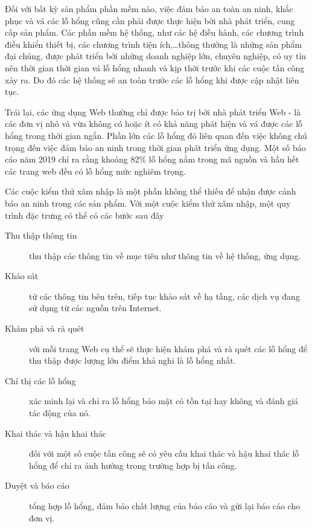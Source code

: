 \documentclass[./../main.tex]{subfiles}
\begin{document}
Đối với bất kỳ sản phẩm phần mềm nào, việc đảm bảo an toàn an ninh, khắc phục và vá các lỗ hổng cũng cần phải được thực hiện bởi nhà phát triển, cung cấp sản phẩm. Các phần mềm hệ thống, như các hệ điều hành, các chương trình điều khiển thiết bị, các chương trình tiện ích,\ldots thông thường là những sản phẩm đại chúng, được phát triển bởi những doanh nghiệp lớn, chuyên nghiệp, có uy tín nên thời gian thời gian vá lỗ hổng nhanh và kịp thời trước khi các cuộc tấn công xảy ra. Do đó các hệ thống sẽ an toàn trước các lỗ hổng khi được cập nhật liên tục.


Trái lại, các ứng dụng Web thường chỉ được bảo trị bởi nhà phát triển Web -
là các đơn vị nhỏ và vừa không có hoặc ít có khả năng phát hiện và vá được các lỗ hổng trong thời gian ngắn. Phần lớn các lỗ hổng đó liên quan đến việc không chú trọng đến việc đảm bảo an ninh trong thời gian phát triển ứng dụng. Một số báo cáo năm 2019 chỉ ra rằng khoảng 82\% lỗ hổng nằm trong mã nguồn và hầu hết các trang web đều có lỗ hổng mức nghiêm trọng.

Các cuộc kiểm thử xâm nhập là một phần không thể thiếu để nhận được cảnh báo an ninh trong các sản phẩm. Với một cuộc kiểm thử xâm nhập, một quy trình đặc trưng có thể có các bước sau đây

\begin{description}
	\item [Thu thập thông tin] thu thập các thông tin về mục tiêu như thông tin về hệ thống, ứng dụng.
	\item [Khảo sát] từ các thông tin bên trên, tiếp tục khảo sát về hạ tầng, các dịch vụ đang sử dụng từ các nguồn trên Internet.
	\item [Khám phá và rà quét] với mỗi trang Web cụ thể sẽ thực hiện khám phá và rà quét các lỗ hổng để thu thập được lượng lớn điểm khả nghi là lỗ hổng nhất.
	\item [Chỉ thị các lỗ hổng] xác minh lại và chỉ ra lỗ hổng bảo mật có tồn tại hay không và đánh giá tác động của nó.
	\item [Khai thác và hậu khai thác] đối với một số cuộc tấn công sẽ có yêu cầu khai thác và hậu khai thác lỗ hổng để chỉ ra ảnh hưởng trong trường hợp bị tấn công.
	\item [Duyệt và báo cáo] tổng hợp lỗ hổng, đảm bảo chất lượng của báo cáo và gửi lại báo cáo cho đơn vị.
\end{description}
\end{document}
